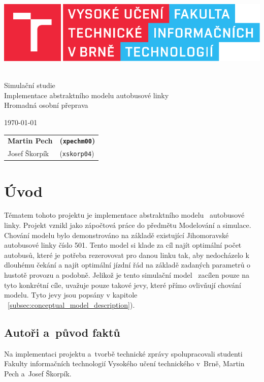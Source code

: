 \documentclass[a4paper]{article}
\newcommand{\logo} {
    \includegraphics[scale=0.8, keepaspectratio]{fig/logo.pdf}
}
\begin{document}
    \begin{titlepage}
        \begin{center}
            \logo
            \\
            {\Huge Simulační studie}\\\medskip
            {\LARGE Implementace abstraktního modelu autobusové linky}\\\medskip
            {\large	Hromadná osobní přeprava}
        \end{center}
        {\Large \today \hfill
        \begin{tabular}{l l}
            \textbf{Martin Pech} & \textbf{(\texttt{xpechm00})} \\
            Josef Škorpík & (\texttt{xskorp04})
        \end{tabular}}
    \end{titlepage}

    \newpage

	\section{Úvod}
    \label{sec:intro}

    Tématem tohoto projektu je implementace abstraktního modelu~\cite[snímek 10]{IMS_slides} autobusové linky.
    Projekt vznikl jako zápočtová práce do předmětu Modelování a simulace. Chování modelu bylo demonstrováno na základě existující Jihomoravské autobusové linky číslo 501. Tento model si klade za cíl najít optimální počet autobusů, které je potřeba rezerovovat pro danou linku tak, aby nedocházelo k dlouhému čekání a najít optimální jízdní řád na základě zadaných parametrů o hustotě provozu a podobně. Jelikož je tento simulační model~\cite[snímek 44]{IMS_slides} zacílen pouze na tyto konkrétní cíle, uvažuje pouze takové jevy, které přímo ovlivňují chování modelu. Tyto jevy jsou popsány v kapitole ~\ref{subsec:conceptual_model_description}).

        \subsection{Autoři a~původ faktů}
        \label{subsec:authors}

            Na implementaci projektu a~tvorbě technické zprávy spolupracovali studenti Fakulty informačních technologií Vysokého učení technického v~Brně, Martin Pech a~Josef Škorpík.
            
\end{document}
